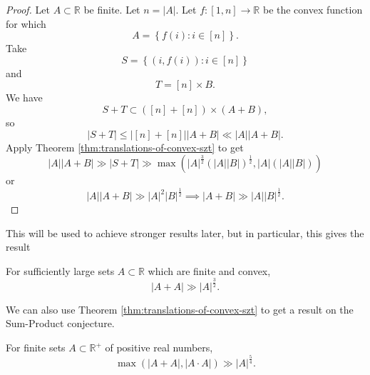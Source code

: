 \documentclass[12pt,reqno]{amsart}
\begin{document}
\begin{proof}
Let \(A \subset \mathbb{R} \) be finite. Let \(n = \left\lvert A \right\rvert \). Let \(f : [1,n] \to \mathbb{R} \) be the
convex function for which
\[
    A = \left\{ f(i) : i \in [n] \right\} 
.\]
Take
\[
    S = \left\{ (i,f(i)) : i \in [n]\right\} 
\]
and
\[
    T = [n] \times B
.\]
We have
\[
    S + T \subset \left( [n] + [n] \right)  \times \left( A + B \right) 
,\]
so
\[
    \left\lvert S + T \right\rvert \leq \left\lvert [n] + [n] \right\rvert \left\lvert A + B \right\rvert \ll \left\lvert A \right\rvert \left\lvert A + B \right\rvert 
.\]
Apply Theorem \ref{thm:translations-of-convex-szt} to get
\[
    \left\lvert A \right\rvert \left\lvert A + B \right\rvert \gg \left\lvert S + T \right\rvert \gg \max \left( \left\lvert A \right\rvert ^{\frac{3}{2} }\left( \left\lvert A \right\rvert \left\lvert B \right\rvert  \right) ^{\frac{1}{2} }, \left\lvert A \right\rvert \left( \left\lvert A \right\rvert \left\lvert B \right\rvert  \right)  \right) 
\]
or
\[
    \left\lvert A \right\rvert \left\lvert A + B \right\rvert \gg \left\lvert A \right\rvert ^{2}\left\lvert B \right\rvert ^{\frac{1}{2} } \implies  \left\lvert A + B \right\rvert \gg \left\lvert A \right\rvert \left\lvert B \right\rvert ^{\frac{1}{2} }
.\]
\end{proof}

This will be used to achieve stronger results later, but in particular, this gives the result
\begin{corollary}
For sufficiently large sets \(A \subset \mathbb{R} \) which are finite and convex,
\[
    \left\lvert A+A \right\rvert \gg \left\lvert A \right\rvert ^{\frac{3}{2} }
.\]
\end{corollary}

We can also use Theorem \ref{thm:translations-of-convex-szt} to get a result
on the Sum-Product conjecture.
\begin{corollary}
    For finite sets \(A \subset \mathbb{R}^{+} \) of positive real numbers,
    \[
        \max \left( \left\lvert A+A \right\rvert, \left\lvert A\cdot A \right\rvert  \right) \gg \left\lvert A \right\rvert ^{\frac{5}{4} }
    .\]
\end{corollary}
\end{document}
